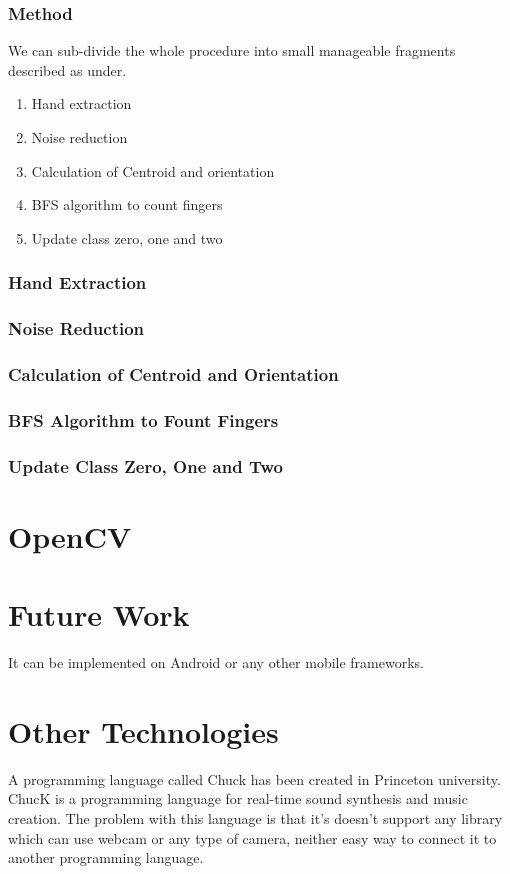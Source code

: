 \documentclass{report}
\begin{document}
\subsubsection{Method}
We can sub-divide the whole procedure into small manageable fragments described as under.
\begin{enumerate}
\item{Hand extraction}

\item{Noise reduction}
\item{Calculation of Centroid and orientation}
\item{BFS algorithm to count fingers}
\item{Update class zero, one and two}
\end{enumerate}
\subsubsection{Hand Extraction}


\subsubsection{Noise Reduction}


\subsubsection{Calculation of Centroid and Orientation}

\subsubsection{BFS Algorithm to Fount Fingers}

\subsubsection{Update Class Zero, One and Two}

\section{OpenCV}

\section{Future Work}
It can be implemented on Android or any other mobile frameworks.
\section{Other Technologies}
A programming language called Chuck has been created in Princeton university. ChucK is a programming language for real-time sound synthesis and music creation. The problem with this language is that it's doesn't support any library which can use webcam or any type of camera, neither easy way to connect it to another programming language.


\end{document}
